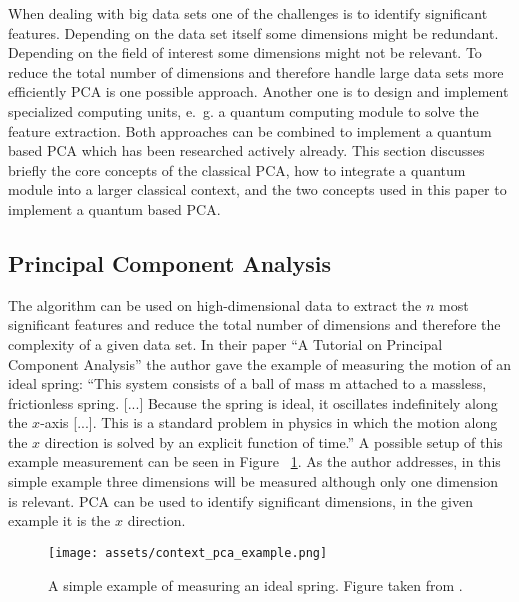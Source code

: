 \noindent
When dealing with big data sets one of the challenges is to identify significant features. Depending on the data set itself some dimensions might be redundant. Depending on the field of interest some dimensions might not be relevant. To reduce the total number of dimensions and therefore handle large data sets more efficiently PCA is one possible approach. Another one is to design and implement specialized computing units, e.~g. a quantum computing module to solve the feature extraction. Both approaches can be combined to implement a quantum based PCA which has been researched actively already. This section discusses briefly the core concepts of the classical PCA, how to integrate a quantum module into a larger classical context, and the two concepts used in this paper to implement a quantum based PCA.

\subsection{Principal Component Analysis}
\label{subsec:pca}
The algorithm can be used on high-dimensional data to extract the $n$ most significant features and reduce the total number of dimensions and therefore the complexity of a given data set. In their paper \enquote{A Tutorial on Principal Component Analysis} \cite{Shlen_2014} the author gave the example of measuring the motion of an ideal spring: \enquote{This system consists of a ball of mass m attached to a massless, frictionless spring. [...] Because the spring is ideal, it oscillates indefinitely along the $x$-axis [...]. This is a standard problem in physics in which the motion along the $x$ direction is solved by an explicit function of time.} \cite[p. 1]{Shlen_2014} A possible setup of this example measurement can be seen in Figure ~\ref{fig:pcaexample}. As the author addresses, in this simple example three dimensions will be measured although only one dimension is relevant. PCA can be used to identify significant dimensions, in the given example it is the $x$ direction.

\begin{figure}
  \centering
  \texttt{[image: assets/context\_pca\_example.png]}
  \caption{A simple example of measuring an ideal spring. Figure taken from \cite{Shlen_2014}.}
  \label{fig:pcaexample}
\end{figure}

